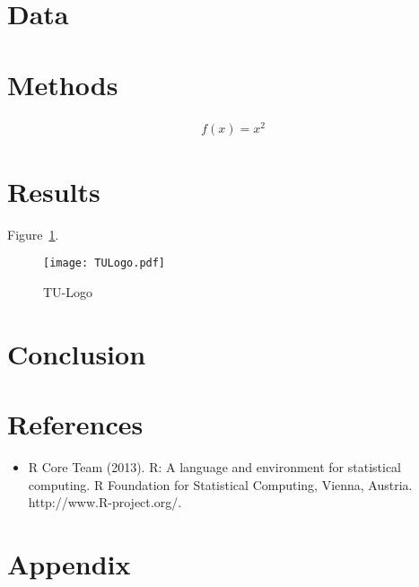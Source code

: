\documentclass[12pt,a4paper]{article}
\numberwithin{equation}{section}
\begin{document}
\blindtext


\section{Data}


\section{Methods}


\begin{align}
	f(x) = x^2
\end{align}

\section{Results}

Figure~\ref{fig:logo}.

\begin{figure}[ht!]
\centering
\texttt{[image: TULogo.pdf]}
\caption{TU-Logo}
\label{fig:logo}
\end{figure}


\section{Conclusion}



\newpage
\section*{References}

\begin{itemize}[itemindent=-0.7cm, label=]
\item R Core Team (2013). R: A language and environment for statistical
  computing. R Foundation for Statistical Computing, Vienna, Austria.
  http://www.R-project.org/.

\end{itemize}


\newpage
\section*{Appendix}

\setcounter{equation}{0}
\renewcommand\theequation{\Alph{section}.\arabic{equation}}	
\setcounter{table}{0}
\renewcommand\thetable{\Alph{section}.\arabic{table}}
\setcounter{figure}{0}
\renewcommand\thefigure{\Alph{section}.\arabic{figure}}
\end{document}
